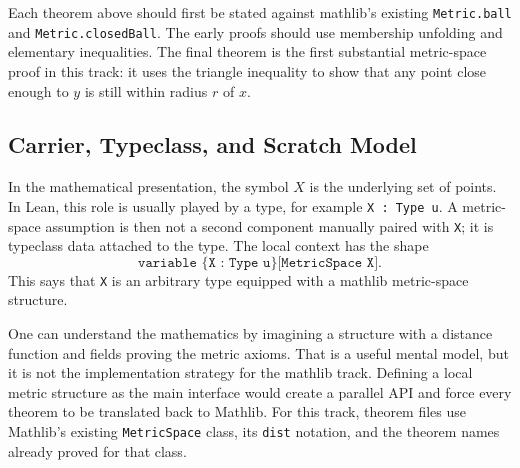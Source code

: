 \begin{remark*}
Each theorem above should first be stated against mathlib's existing
\texttt{Metric.ball} and \texttt{Metric.closedBall}. The early proofs should
use membership unfolding and elementary inequalities. The final theorem is the
first substantial metric-space proof in this track: it uses the triangle
inequality to show that any point close enough to \(y\) is still within radius
\(r\) of \(x\).
\end{remark*}

\subsection{Carrier, Typeclass, and Scratch Model}

\begin{remark*}
In the mathematical presentation, the symbol $X$ is the underlying set of
points. In Lean, this role is usually played by a type, for example
\texttt{X : Type u}. A metric-space assumption is then not a second component
manually paired with \texttt{X}; it is typeclass data attached to the type.
The local context has the shape
\[
  \texttt{variable \{X : Type u\} [MetricSpace X]}.
\]
This says that \texttt{X} is an arbitrary type equipped with a mathlib
metric-space structure.
\end{remark*}

\begin{remark*}
One can understand the mathematics by imagining a structure with a distance
function and fields proving the metric axioms. That is a useful mental model,
but it is not the implementation strategy for the mathlib track. Defining a
local metric structure as the main interface would create a parallel API and
force every theorem to be translated back to Mathlib. For this track, theorem
files use Mathlib's existing \texttt{MetricSpace} class, its \texttt{dist}
notation, and the theorem names already proved for that class.
\end{remark*}

